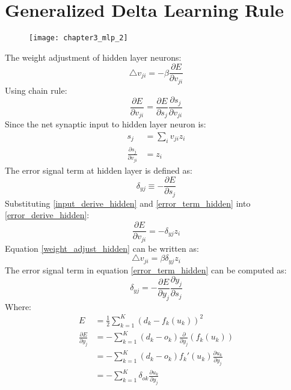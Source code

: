 \section{Generalized Delta Learning Rule}
\begin{figure}[h]
\texttt{[image: chapter3\_mlp\_2]}
\end{figure}
\noindent The weight adjustment of hidden layer neurons:
\begin{equation}
\triangle v_{ji} = -\beta \frac{\partial E}{\partial v_{ji}}
\label{weight_adjust_hidden}
\end{equation}
Using chain rule:
\begin{equation}
\frac{\partial E}{\partial v_{ji}} = \frac{\partial E}{\partial s_j} \frac{\partial s_j}{\partial v_{ji}}
\label{error_derive_hidden}
\end{equation}
Since the net synaptic input to hidden layer neuron is:
\begin{equation}
\begin{split}
s_j &= \sum_{i} v_{ji} z_i\\
\frac{\partial s_j}{\partial v_{ji} } &= z_i
\end{split}
\label{input_derive_hidden}
\end{equation}
The error signal term at hidden layer is defined as:
\begin{equation}
\delta_{yj} \equiv - \frac{\partial E}{\partial s_j}
\label{error_term_hidden}
\end{equation}
Substituting \ref{input_derive_hidden} and \ref{error_term_hidden} into \ref{error_derive_hidden}:
$$\frac{\partial E}{\partial v_{ji}} = - \delta_{yj} z_i$$
Equation \ref{weight_adjust_hidden} can be written as:
$$ \triangle v_{ji} = \beta \delta_{yj} z_i $$
The error signal term in equation \ref{error_term_hidden} can be computed as:
\begin{equation}
\delta_{yj} = - \frac{\partial E}{\partial y_j} \frac{\partial y_j}{\partial s_j}
\label{error_term_derive_hidden}
\end{equation}
Where:
\begin{equation}
\begin{split}
E &= \frac{1}{2} \sum_{k=1}^{K} (d_k - f_k (u_k))^{2} \\
\frac{\partial E}{\partial y_j} &= - \sum_{k=1}^{K} (d_k - o_k) \frac{\partial}{\partial y_j} (f_k (u_k)) \\
&= - \sum_{k=1}^{K} (d_k - o_k) f_k' (u_k) \frac{\partial u_k}{\partial y_j} \\
&= - \sum_{k=1}^{K} \delta_{ok} \frac{\partial u_k}{\partial y_j}
\end{split}
\label{temp1}
\end{equation}
